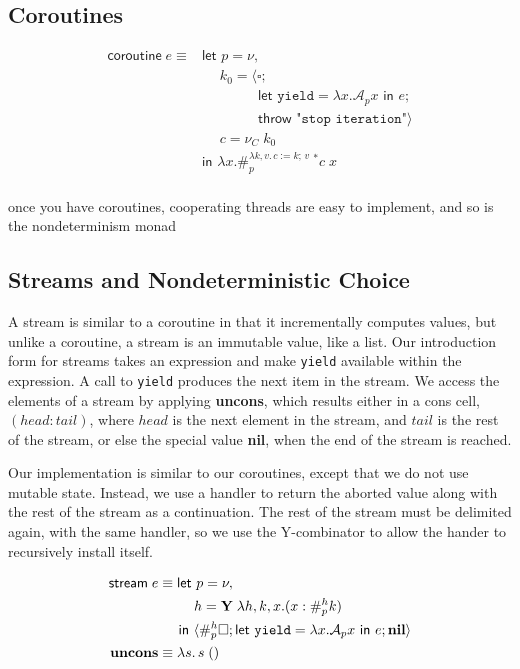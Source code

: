 \documentclass[11pt]{article}
\newcommand{\maybePage}{\newpage}
\newcommand\x{\lambda x}
\newcommand{\letin}[2]{\textsf{let }#1\textsf{ in }#2}
\newcommand\A{\mathcal{A}}
\newcommand{\angles}[1]{\langle#1\rangle}
\begin{document}
\maybePage
\subsection{Coroutines}

\begin{align*}
\textsf{coroutine}\;e \equiv{}
&\textsf{let }p = \nu, \\
  &\quad\; k_0 = \angles{
    \square; \\
    &\qquad\qquad \letin{\texttt{yield}=\x.{\A_px}}{e}; \\
    &\qquad\qquad \textsf{throw }\texttt{"stop iteration"}} \\
  &\quad\; c = \nu_C\;k_0 \\
  &\textsf{in }
  \x.\#_p^{\lambda k,v.\,c:=k;\,v}\: ^*\!c\;x \\
\end{align*}

once you have coroutines, cooperating threads are easy to implement,
and so is the nondeterminism monad

\subsection{Streams and Nondeterministic Choice}

A stream is similar to a coroutine in that it incrementally computes values, but unlike a coroutine, a stream is an immutable value, like a list.
Our introduction form for streams takes an expression and make \texttt{yield} available within the expression.
A call to \texttt{yield} produces the next item in the stream.
We access the elements of a stream by applying \textbf{uncons}, which results either in a cons cell, $(head:tail)$, where $head$ is the next element in the stream, and $tail$ is the rest of the stream, or else the special value \textbf{nil}, when the end of the stream is reached.

Our implementation is similar to our coroutines, except that we do not use mutable state.
Instead, we use a handler to return the aborted value along with the rest of the stream as a continuation.
The rest of the stream must be delimited again, with the same handler, so we use the Y-combinator to allow the hander to recursively install itself.

\begin{align*}
\textsf{stream}\;e &\equiv{}
\textsf{let }p = \nu, \\
  &\qquad\;\; h = \textbf Y\;\lambda h,k,x.(x:\#_p^hk) \\
  &\quad\;\,\textsf{in }
  \angles{\#_p^{h}\square; \letin{\texttt{yield}=\x.{\A_px}}{e}; \textbf{nil}} \\
\textbf{uncons} &\equiv \lambda s.\,s\;() \\
\end{align*}
\end{document}
